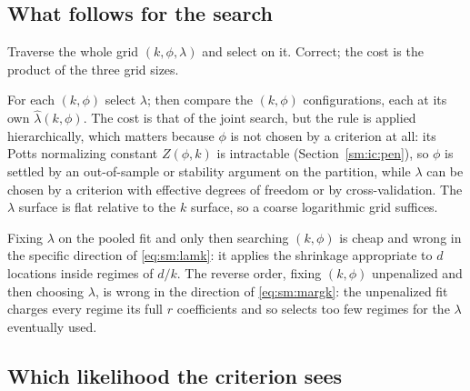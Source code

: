 \documentclass[11pt]{article}
\begin{document}
\subsection{What follows for the search}

\begin{description}[leftmargin=1.2em,itemsep=3pt,topsep=3pt]
  \item[\textbf{Joint.}] Traverse the whole grid $(k,\phi,\lambda)$ and select on it. Correct; the cost is the product of the three grid sizes.
  \item[\textbf{Profiled, which we recommend.}] For each $(k,\phi)$ select $\lambda$; then compare the $(k,\phi)$ configurations, each at its own $\hat\lambda(k,\phi)$. The cost is that of the joint search, but the rule is applied hierarchically, which matters because $\phi$ is not chosen by a criterion at all: its Potts normalizing constant $Z(\phi,k)$ is intractable (Section~\ref{sm:ic:pen}), so $\phi$ is settled by an out-of-sample or stability argument on the partition, while $\lambda$ can be chosen by a criterion with effective degrees of freedom or by cross-validation. The $\lambda$ surface is flat relative to the $k$ surface, so a coarse logarithmic grid suffices.
  \item[\textbf{Sequential, and why not.}] Fixing $\lambda$ on the pooled fit and only then searching $(k,\phi)$ is cheap and wrong in the specific direction of \eqref{eq:sm:lamk}: it applies the shrinkage appropriate to $d$ locations inside regimes of $d/k$. The reverse order, fixing $(k,\phi)$ unpenalized and then choosing $\lambda$, is wrong in the direction of \eqref{eq:sm:margk}: the unpenalized fit charges every regime its full $r$ coefficients and so selects too few regimes for the $\lambda$ eventually used.
\end{description}

\subsection{Which likelihood the criterion sees}
\end{document}
